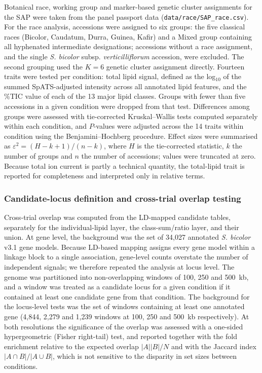 Botanical race, working group and marker-based genetic cluster assignments for the SAP were taken from the panel passport data (\texttt{data/race/SAP\_race.csv}). For the race analysis, accessions were assigned to six groups: the five classical races (Bicolor, Caudatum, Durra, Guinea, Kafir) and a Mixed group containing all hyphenated intermediate designations; accessions without a race assignment, and the single \textit{S. bicolor} subsp. \textit{verticilliflorum} accession, were excluded. The second grouping used the $K=6$ genetic cluster assignment directly. Fourteen traits were tested per condition: total lipid signal, defined as the log$_{10}$ of the summed SpATS-adjusted intensity across all annotated lipid features, and the \%TIC value of each of the 13 major lipid classes. Groups with fewer than five accessions in a given condition were dropped from that test. Differences among groups were assessed with tie-corrected Kruskal--Wallis tests computed separately within each condition, and $P$-values were adjusted across the 14 traits within condition using the Benjamini--Hochberg procedure. Effect sizes were summarised as $\varepsilon^2 = (H-k+1)/(n-k)$, where $H$ is the tie-corrected statistic, $k$ the number of groups and $n$ the number of accessions; values were truncated at zero. Because total ion current is partly a technical quantity, the total-lipid trait is reported for completeness and interpreted only in relative terms.

\subsubsection{Candidate-locus definition and cross-trial overlap testing}

Cross-trial overlap was computed from the LD-mapped candidate tables, separately for the individual-lipid layer, the class-sum/ratio layer, and their union. At gene level, the background was the set of 34{,}027 annotated \textit{S. bicolor} v3.1 gene models. Because LD-based mapping assigns every gene model within a linkage block to a single association, gene-level counts overstate the number of independent signals; we therefore repeated the analysis at locus level. The genome was partitioned into non-overlapping windows of 100, 250 and 500~kb, and a window was treated as a candidate locus for a given condition if it contained at least one candidate gene from that condition. The background for the locus-level tests was the set of windows containing at least one annotated gene (4{,}844, 2{,}279 and 1{,}239 windows at 100, 250 and 500~kb respectively). At both resolutions the significance of the overlap was assessed with a one-sided hypergeometric (Fisher right-tail) test, and reported together with the fold enrichment relative to the expected overlap $|A||B|/N$ and with the Jaccard index $|A\cap B|/|A\cup B|$, which is not sensitive to the disparity in set sizes between conditions.

